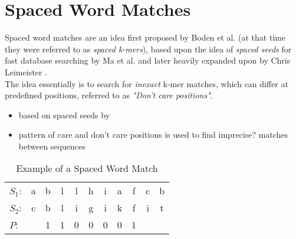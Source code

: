 


\section{Spaced Word Matches}

Spaced word matches are an idea first proposed by Boden et al. \cite{boden2013alignment} (at that time they were referred to as \textit{spaced k-mers}), based upon the idea of \textit{spaced seeds} for fast database searching by Ma et al. \cite{ma2002patternhunter} and later heavily expanded upon by Chris Leimeister \cite{leimeister2014fast, leimeister2017fast, leimeister2018accurate}.\\
The idea essentially is to search for \textit{inexact} k-mer matches, which can differ at predefined positions, referred to as \textit{"Don't care positions"}. 

\begin{itemize}
	\item based on spaced seeds by \cite{ma2002patternhunter}
	\item pattern of care and don't care positions is used to find imprecise? matches between sequences 
\end{itemize}

\begin{table}[H]
	\centering
	\begin{tabular}{ l c c c c c c c c c c}
		$S_1$: & a&b&l&l&h&i&a&f&c&b \\ 
		$S_2$: & c&b&l&i&g&i&k&f&i&t \\  
		$P$: &    &1&1&0&0&0&0&1
	\end{tabular}
	\caption{Example of a Spaced Word Match}
	\label{tab:spaced-word}
\end{table}

